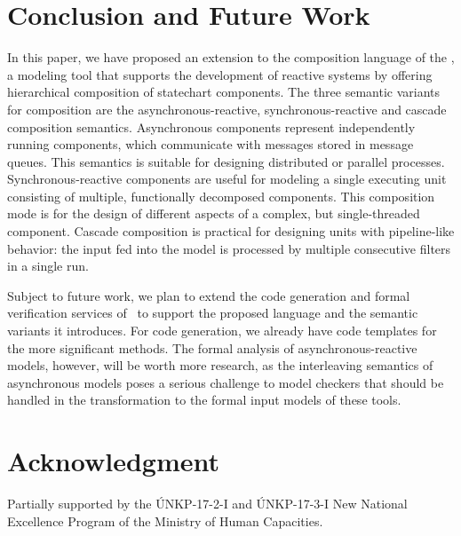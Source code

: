 \section{Conclusion and Future Work}
\label{sec:conclusion}
In this paper, we have proposed an extension to the composition language of the \framework, a modeling tool that supports the development of reactive systems by offering hierarchical composition of statechart components. The three semantic variants for composition are the asynchronous-reactive, synchronous-reactive and cascade composition semantics. Asynchronous components represent independently running components, which communicate with messages stored in message queues. This semantics is suitable for designing
distributed or parallel processes. Synchronous-reactive components are useful for modeling a single executing unit consisting of multiple, functionally decomposed components.
This composition mode is for the design of different aspects of a complex, but single-threaded component. Cascade composition is practical for designing units with pipeline-like behavior: the input fed into the model is processed by multiple consecutive filters in a single run.

Subject to future work, we plan to extend the code generation and formal verification services of \gamma\ to support the proposed language and the semantic variants it introduces. For code generation, we already have code templates for the more significant methods. The formal analysis of asynchronous-reactive models, however, will be worth more research, as the interleaving semantics of asynchronous models poses a serious challenge to model checkers that should be handled in the transformation to the formal input models of these tools.

\section*{Acknowledgment}
Partially supported by the \'UNKP-17-2-I and \'UNKP-17-3-I New National Excellence Program of the Ministry of Human Capacities.
